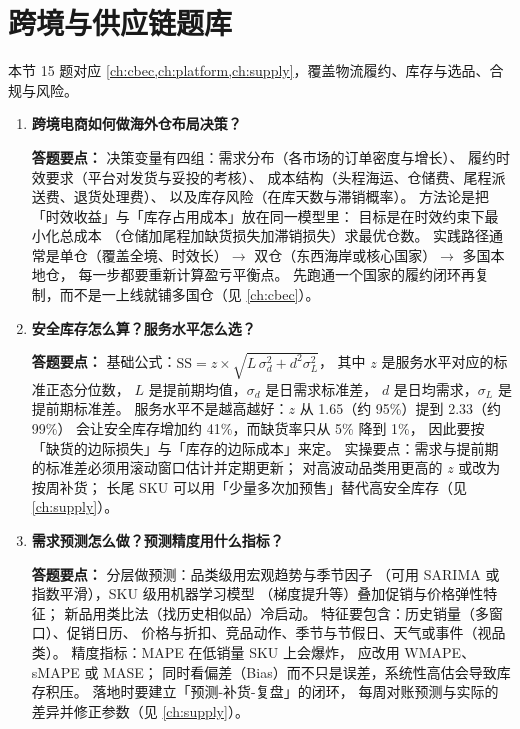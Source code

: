 \begin{interview}[题库与答题要点]
\begin{enumerate}[label=]
\end{enumerate}

\end{interview}

\section{跨境与供应链题库}

本节 15 题对应 \cref{ch:cbec,ch:platform,ch:supply}，覆盖物流履约、库存与选品、合规与风险。

\begin{interview}[题库与答题要点]

\begin{enumerate}[label=]

  \item[\textcolor{VioletDeep}{\textbf{Q102.}}] \textbf{跨境电商如何做海外仓布局决策？}
\par\smallskip\noindent\textcolor{VioletDeep}{\textbf{答题要点：}}
决策变量有四组：需求分布（各市场的订单密度与增长）、
履约时效要求（平台对发货与妥投的考核）、
成本结构（头程海运、仓储费、尾程派送费、退货处理费）、
以及库存风险（在库天数与滞销概率）。
方法论是把「时效收益」与「库存占用成本」放在同一模型里：
目标是在时效约束下最小化总成本
（仓储加尾程加缺货损失加滞销损失）求最优仓数。
实践路径通常是单仓（覆盖全境、时效长）$\to$
双仓（东西海岸或核心国家）$\to$ 多国本地仓，
每一步都要重新计算盈亏平衡点。
先跑通一个国家的履约闭环再复制，而不是一上线就铺多国仓（见 \cref{ch:cbec}）。

  \item[\textcolor{VioletDeep}{\textbf{Q103.}}] \textbf{安全库存怎么算？服务水平怎么选？}
\par\smallskip\noindent\textcolor{VioletDeep}{\textbf{答题要点：}}
基础公式：$\text{SS} = z \times \sqrt{L\,\sigma_d^2 + d^2\sigma_L^2}$，
其中 $z$ 是服务水平对应的标准正态分位数，
$L$ 是提前期均值，$\sigma_d$ 是日需求标准差，
$d$ 是日均需求，$\sigma_L$ 是提前期标准差。
服务水平不是越高越好：$z$ 从 1.65（约 95\%）提到 2.33（约 99\%）
会让安全库存增加约 41\%，而缺货率只从 5\% 降到 1\%，
因此要按「缺货的边际损失」与「库存的边际成本」来定。
实操要点：需求与提前期的标准差必须用滚动窗口估计并定期更新；
对高波动品类用更高的 $z$ 或改为按周补货；
长尾 SKU 可以用「少量多次加预售」替代高安全库存（见 \cref{ch:supply}）。

  \item[\textcolor{VioletDeep}{\textbf{Q104.}}] \textbf{需求预测怎么做？预测精度用什么指标？}
\par\smallskip\noindent\textcolor{VioletDeep}{\textbf{答题要点：}}
分层做预测：品类级用宏观趋势与季节因子
（可用 SARIMA 或指数平滑），SKU 级用机器学习模型
（梯度提升等）叠加促销与价格弹性特征；
新品用类比法（找历史相似品）冷启动。
特征要包含：历史销量（多窗口）、促销日历、
价格与折扣、竞品动作、季节与节假日、天气或事件（视品类）。
精度指标：MAPE 在低销量 SKU 上会爆炸，
应改用 WMAPE、sMAPE 或 MASE；
同时看偏差（Bias）而不只是误差，系统性高估会导致库存积压。
落地时要建立「预测-补货-复盘」的闭环，
每周对账预测与实际的差异并修正参数（见 \cref{ch:supply}）。


\end{enumerate}
\end{interview}

